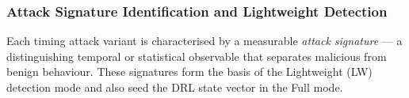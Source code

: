 \subsubsection{Attack Signature Identification and Lightweight Detection}
\label{sec:signatures}

Each timing attack variant is characterised by a measurable
\emph{attack signature} — a distinguishing temporal or statistical
observable that separates malicious from benign behaviour. These
signatures form the basis of the Lightweight (LW) detection mode and
also seed the DRL state vector in the Full mode.

